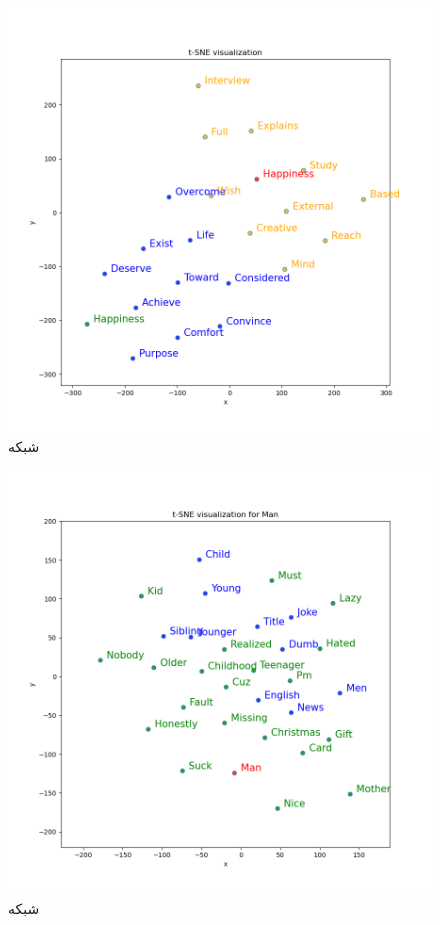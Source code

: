 \documentclass[10pt]{article}
\begin{document}
	\begin{figure}[ht!]
		\centering\includegraphics[width=\linewidth]{../reports/word_vectors_common_happiness.png}
		\caption{شبکه 
			}
		\label{word2vec-1}
	\end{figure}

	\begin{figure}[ht!]
	\centering\includegraphics[width=\linewidth]{../reports/_word_vectors_common_man.png}
	\caption{شبکه 
		}
	\label{word2vec-2}
	\end{figure}
\end{document}

